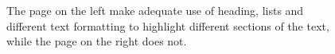 \begin{itemize}
    \begin{figure}[!ht]
        \centering
        \qquad
        \caption{The page on the left make adequate use of heading, lists and different text formatting to highlight different sections of the text, while the page on the right does not.}%
        \label{fig:MC1-2}%
    \end{figure}



\end{itemize}
